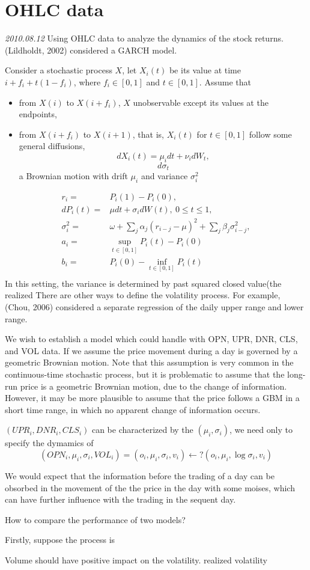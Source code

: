\section{OHLC data}
\textit{2010.08.12}
Using OHLC data to analyze the dynamics of the stock returns.
(Lildholdt, 2002) considered a GARCH model.

Consider a stochastic process $ X $, let $ X_i(t) $ be its value at time $ i+f_i+t(1-f_i) $, where $ f_i\in [0,1] $ and $ t\in[0,1] $. Assume that
\begin{itemize}
\item  from $ X(i) $ to $ X(i+f_i) $, $ X $ unobservable except its values at the endpoints,
\item from $ X(i+f_i) $ to $ X(i+1) $, that is, $ X_i(t) $ for $ t\in[0,1] $ follow some general diffusions,
\[ dX_i(t)=\mu_i dt + \nu_i d W_t, \]
\[ d\sigma_t \]a Brownian motion with drift $ \mu_i $ and variance $ \sigma_i^2 $
\end{itemize}
\begin{align*}
r_i=&P_i(1)-P_i(0),\\
dP_i(t)=&\mu dt+\sigma_i dW(t), \ 0\leq t\leq 1,\\
\sigma_i^2=&\omega+\sum_j\alpha_j(r_{i-j}-\mu)^2+\sum_j \beta_j\sigma^2_{i-j},\\
a_i=&\sup_{t\in[0,1]}P_i(t)-P_i(0)\\
b_i=&P_i(0)-\inf_{t\in[0,1]}P_i(t)\\
\end{align*}
In this setting, the variance is determined by past squared closed value(the realized
There are other ways to define the volatility process. For example, (Chou, 2006) considered a separate regression of the daily upper range and lower range. 

We wish to establish a model which could handle with OPN, UPR, DNR, CLS, and VOL data. If we assume the price movement during a day is governed by a geometric Brownian motion. Note that this assumption is very common in the 
continuous-time stochastic process, but it is problematic to assume that the long-run price is a geometric Brownian motion, due to the change of information. However, it may be more plausible to assume that the price follows a GBM in a short time range, in which no apparent change of information occurs.

$( UPR_i, DNR_i, CLS_i ) $ can be characterized by the $ (\mu_i, \sigma_i) $,  we need only to specify the dymamics of $$ (OPN_i,\mu_i,\sigma_i, VOL_i)=(o_i,\mu_i,\sigma_i,v_i)\leftarrow ?(o_i,\mu_i,\log \sigma_i,v_i) $$

We would expect that the information before the trading of a day can be obsorbed in the movement of the the price in the day with some moises, which can have further influence with the trading in the sequent day.

How to compare the performance of two models?

Firstly, suppose the process is 



Volume should have positive impact on the volatility.
realized volatility
